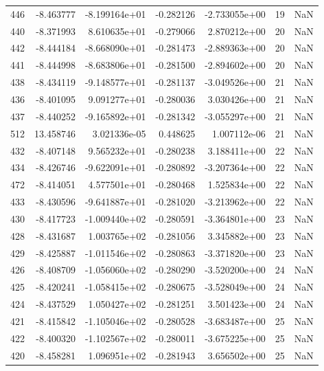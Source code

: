 \begin{tabular}{rrrrrrr}
 446 &  -8.463777 & -8.199164e+01 & -0.282126 & -2.733055e+00 &          19 & NaN \\
 440 &  -8.371993 &  8.610635e+01 & -0.279066 &  2.870212e+00 &          20 & NaN \\
 442 &  -8.444184 & -8.668090e+01 & -0.281473 & -2.889363e+00 &          20 & NaN \\
 441 &  -8.444998 & -8.683806e+01 & -0.281500 & -2.894602e+00 &          20 & NaN \\
 438 &  -8.434119 & -9.148577e+01 & -0.281137 & -3.049526e+00 &          21 & NaN \\
 436 &  -8.401095 &  9.091277e+01 & -0.280036 &  3.030426e+00 &          21 & NaN \\
 437 &  -8.440252 & -9.165892e+01 & -0.281342 & -3.055297e+00 &          21 & NaN \\
 512 &  13.458746 &  3.021336e-05 &  0.448625 &  1.007112e-06 &          21 & NaN \\
 432 &  -8.407148 &  9.565232e+01 & -0.280238 &  3.188411e+00 &          22 & NaN \\
 434 &  -8.426746 & -9.622091e+01 & -0.280892 & -3.207364e+00 &          22 & NaN \\
 472 &  -8.414051 &  4.577501e+01 & -0.280468 &  1.525834e+00 &          22 & NaN \\
 433 &  -8.430596 & -9.641887e+01 & -0.281020 & -3.213962e+00 &          22 & NaN \\
 430 &  -8.417723 & -1.009440e+02 & -0.280591 & -3.364801e+00 &          23 & NaN \\
 428 &  -8.431687 &  1.003765e+02 & -0.281056 &  3.345882e+00 &          23 & NaN \\
 429 &  -8.425887 & -1.011546e+02 & -0.280863 & -3.371820e+00 &          23 & NaN \\
 426 &  -8.408709 & -1.056060e+02 & -0.280290 & -3.520200e+00 &          24 & NaN \\
 425 &  -8.420241 & -1.058415e+02 & -0.280675 & -3.528049e+00 &          24 & NaN \\
 424 &  -8.437529 &  1.050427e+02 & -0.281251 &  3.501423e+00 &          24 & NaN \\
 421 &  -8.415842 & -1.105046e+02 & -0.280528 & -3.683487e+00 &          25 & NaN \\
 422 &  -8.400320 & -1.102567e+02 & -0.280011 & -3.675225e+00 &          25 & NaN \\
 420 &  -8.458281 &  1.096951e+02 & -0.281943 &  3.656502e+00 &          25 & NaN \\

\end{tabular}

